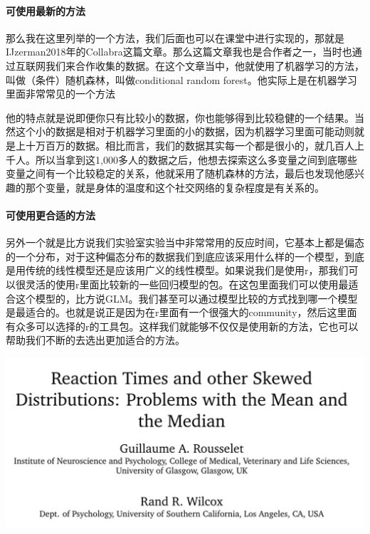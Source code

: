 \documentclass[
  oneside]{book}
\begin{document}
\hypertarget{ux53efux4f7fux7528ux6700ux65b0ux7684ux65b9ux6cd5}{%
\paragraph{可使用最新的方法}\label{ux53efux4f7fux7528ux6700ux65b0ux7684ux65b9ux6cd5}}

那么我在这里列举的一个方法，我们后面也可以在课堂中进行实现的，那就是IJzerman2018年的Collabra这篇文章。那么这篇文章我也是合作者之一，当时也通过互联网我们来合作收集的数据。在这个文章当中，他就使用了机器学习的方法，叫做（条件）随机森林，叫做conditional
random forest。他实际上是在机器学习里面非常常见的一个方法

他的特点就是说即便你只有比较小的数据，你也能够得到比较稳健的一个结果。当然这个小的数据是相对于机器学习里面的小的数据，因为机器学习里面可能动则就是上十万百万的数据。相比而言，我们的数据其实每一个都是很小的，就几百人上千人。所以当拿到这1,000多人的数据之后，他想去探索这么多变量之间到底哪些变量之间有一个比较稳定的关系，他就采用了随机森林的方法，最后也发现他感兴趣的那个变量，就是身体的温度和这个社交网络的复杂程度是有关系的。

\hypertarget{ux53efux4f7fux7528ux66f4ux5408ux9002ux7684ux65b9ux6cd5}{%
\paragraph{可使用更合适的方法}\label{ux53efux4f7fux7528ux66f4ux5408ux9002ux7684ux65b9ux6cd5}}

另外一个就是比方说我们实验室实验当中非常常用的反应时间，它基本上都是偏态的一个分布，对于这种偏态分布的数据我们到底应该采用什么样的一个模型，到底是用传统的线性模型还是应该用广义的线性模型。如果说我们是使用r，那我们可以很灵活的使用r里面比较新的一些回归模型的包。在这包里面我们可以使用最适合这个模型的，比方说GLM。我们甚至可以通过模型比较的方式找到哪一个模型是最适合的。也就是说正是因为在r里面有一个很强大的community，然后这里面有众多可以选择的r的工具包。这样我们就能够不仅仅是使用新的方法，它也可以帮助我们不断的去选出更加适合的方法。

\includegraphics{1001-lesson1/image-20230302201236318.png}
\end{document}
